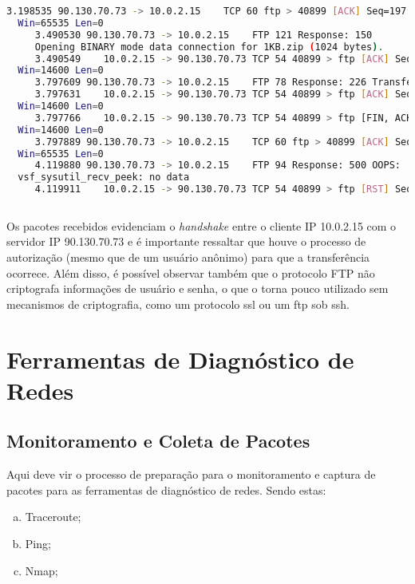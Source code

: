 \documentclass[a4paper]{report} %
\begin{document}
\begin{lstlisting}[language=bash]
     3.198535 90.130.70.73 -> 10.0.2.15    TCP 60 ftp > 40899 [ACK] Seq=197 Ack=83 
  Win=65535 Len=0
     3.490530 90.130.70.73 -> 10.0.2.15    FTP 121 Response: 150 
     Opening BINARY mode data connection for 1KB.zip (1024 bytes).
     3.490549    10.0.2.15 -> 90.130.70.73 TCP 54 40899 > ftp [ACK] Seq=83 Ack=264 
  Win=14600 Len=0
     3.797609 90.130.70.73 -> 10.0.2.15    FTP 78 Response: 226 Transfer complete.
     3.797631    10.0.2.15 -> 90.130.70.73 TCP 54 40899 > ftp [ACK] Seq=83 Ack=288 
  Win=14600 Len=0
     3.797766    10.0.2.15 -> 90.130.70.73 TCP 54 40899 > ftp [FIN, ACK] Seq=83 Ack=288 
  Win=14600 Len=0
     3.797889 90.130.70.73 -> 10.0.2.15    TCP 60 ftp > 40899 [ACK] Seq=288 Ack=84 
  Win=65535 Len=0
     4.119880 90.130.70.73 -> 10.0.2.15    FTP 94 Response: 500 OOPS: 
  vsf_sysutil_recv_peek: no data
     4.119911    10.0.2.15 -> 90.130.70.73 TCP 54 40899 > ftp [RST] Seq=84 Win=0 Len=0
	
\end{lstlisting}	

	Os pacotes recebidos evidenciam o \textit{handshake} entre o cliente IP 10.0.2.15 com o servidor IP 90.130.70.73 e é importante ressaltar que houve o processo de autorização (mesmo que de um usuário anônimo) para que a transferência ocorrece. Além disso, é possível observar também que o protocolo FTP não criptografa informações de usuário e senha, o que o torna pouco utilizado sem mecanismos de criptografia, como um protocolo ssl ou um ftp sob ssh. 

\chapter{Ferramentas de Diagnóstico de Redes}
\label{chap_segundo}

\section{Monitoramento e Coleta de Pacotes}
\label{sec_segundo_monitoramento}

Aqui deve vir o processo de preparação para o monitoramento e captura de pacotes para as ferramentas de
diagnóstico de redes. Sendo estas:
\begin{enumerate}[a)]
 \item Traceroute;
 \item Ping;
 \item Nmap;
\end{enumerate}
\end{document}
